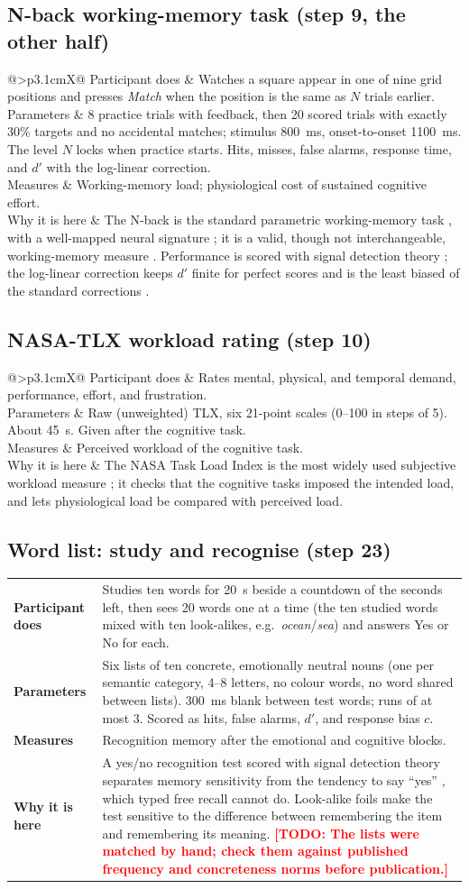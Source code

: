 \documentclass[11pt,a4paper]{article}
\makeatletter
\newcommand{\TODO}[1]{\textcolor{red}{\textbf{[TODO: #1]}}}
\newcommand{\taskdetail}[4]{%
  \begin{tabularx}{\linewidth}{@{}>{\bfseries}p{3.1cm}X@{}}
    Participant does & #1 \\
    Parameters & #2 \\
    Measures & #3 \\
    Why it is here & #4 \\
  \end{tabularx}}
\makeatother
\begin{document}
\subsection{N-back working-memory task (step 9, the other half)}
\taskdetail
{Watches a square appear in one of nine grid positions and presses \emph{Match} when the position is the same as
$N$ trials earlier.}
{8 practice trials with feedback, then 20 scored trials with exactly 30\% targets and no accidental matches;
stimulus 800~ms, onset-to-onset 1100~ms. The level $N$ locks when practice starts. Hits, misses, false alarms,
response time, and $d'$ with the log-linear correction.}
{Working-memory load; physiological cost of sustained cognitive effort.}
{The N-back is the standard parametric working-memory task \cite{kirchner1958}, with a well-mapped neural
signature \cite{owen2005}; it is a valid, though not interchangeable, working-memory measure \cite{jaeggi2010}.
Performance is scored with signal detection theory \cite{stanislaw1999}; the log-linear correction keeps $d'$
finite for perfect scores and is the least biased of the standard corrections \cite{hautus1995}.}

\subsection{NASA-TLX workload rating (step 10)}
\taskdetail
{Rates mental, physical, and temporal demand, performance, effort, and frustration.}
{Raw (unweighted) TLX, six 21-point scales (0--100 in steps of 5). About 45~s. Given after the cognitive task.}
{Perceived workload of the cognitive task.}
{The NASA Task Load Index is the most widely used subjective workload measure \cite{hart1988}; it checks that the
cognitive tasks imposed the intended load, and lets physiological load be compared with perceived load.}

\subsection{Word list: study and recognise (step 23)}
\taskdetail
{Studies ten words for 20~s beside a countdown of the seconds left, then sees 20 words one at a time (the ten
studied words mixed with ten look-alikes, e.g.\ \emph{ocean}/\emph{sea}) and answers Yes or No for each.}
{Six lists of ten concrete, emotionally neutral nouns (one per semantic category, 4--8 letters, no colour words, no
word shared between lists). 300~ms blank between test words; runs of at most 3. Scored as hits, false alarms, $d'$,
and response bias $c$.}
{Recognition memory after the emotional and cognitive blocks.}
{A yes/no recognition test scored with signal detection theory separates memory sensitivity from the tendency to
say ``yes'' \cite{snodgrass1988,stanislaw1999}, which typed free recall cannot do. Look-alike foils make the test
sensitive to the difference between remembering the item and remembering its meaning. \TODO{The lists were matched
by hand; check them against published frequency and concreteness norms \cite{brysbaert2014} before publication.}}
\end{document}
